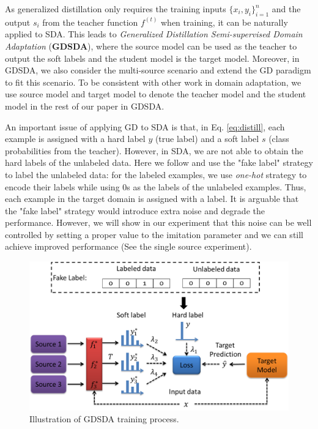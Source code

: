 As generalized distillation only requires the training inputs $\{x_i,y_i\}_{i=1}^n$ and the output $s_i$ from the teacher function $f^{(t)}$ when training, it can be naturally applied to SDA. This leads to \textit{Generalized Distillation Semi-supervised Domain Adaptation} (\textbf{GDSDA}), where the source model can be used as the teacher to output the soft labels and the student model is the target model. Moreover, in GDSDA, we also consider the multi-source scenario and extend the GD paradigm to fit this scenario. To be consistent with other work in domain adaptation, we use source model and target model to denote the teacher model and the student model in the rest of our paper in GDSDA.

An important issue of applying GD to SDA is that, in Eq. \eqref{eq:distill}, each example is assigned with a hard label $y$ (true label) and a soft label $s$ (class probabilities from the teacher). However, in SDA, we are not able to obtain the hard labels of the unlabeled data. Here we follow \cite{lopez2015unifying} and use the "fake label" strategy to label the unlabeled data: for the labeled examples, we use \textit{one-hot} strategy to encode their labels while using 0s as the labels of the unlabeled examples. Thus, each example in the target domain is assigned with a label. It is arguable that the "fake label" strategy would introduce extra noise and degrade the performance. However, we will show in our experiment that this noise can be well controlled by setting a proper value to the imitation parameter and we can still achieve improved performance (See the single source experiment).
\begin{figure}
	\centering
	\includegraphics[scale=.4]{figure/multi-GDDA.png}
	\caption{Illustration of GDSDA training process.}
	\label{fig:GDSDA}
\end{figure}
 

